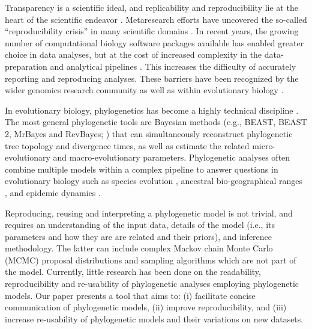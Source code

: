 \documentclass[10pt,letterpaper,table]{article}
\begin{document}
Transparency is a scientific ideal, and replicability and
reproducibility lie at the heart of the scientific endeavor
\cite{nas19,munafo17}. 
Metaresearch efforts have uncovered the so-called ``reproducibility
crisis'' \cite{baker16} in many scientific domains \cite{baker16}. 
In recent years, the growing number of computational biology software packages available has enabled greater choice in data analyses, 
but at the cost of increased complexity in the data-preparation and analytical pipelines \cite{eren2021community}. 
This increases the difficulty of accurately reporting and reproducing analyses. 
These barriers have been recognized by the wider genomics research community \cite{eren2021community} as well as within evolutionary biology \cite{oakley2014osiris}. 

In evolutionary biology, phylogenetics has become a highly technical discipline \cite{oakley2014osiris}. 
The most general phylogenetic tools are Bayesian methods (e.g., BEAST, BEAST 2, MrBayes and
RevBayes; \cite{beast,beast2,revbayes,mrbayes}) 
that can simultaneously reconstruct phylogenetic tree topology and divergence times, as well as estimate the related micro-evolutionary and macro-evolutionary parameters. 
Phylogenetic analyses often combine multiple models within a complex pipeline to answer questions in evolutionary biology such as species evolution \cite{gavryushkina17,ogilvie21,zhang21}, ancestral bio-geographical ranges \cite{lemey10,landis18}, and 
epidemic dynamics \cite{faria21,douglas21}. 

Reproducing, reusing and interpreting a phylogenetic model is not trivial, and requires an understanding of the input data, details of the model (i.e., its parameters and how they are are related and their priors), and inference methodology. 
The latter can include complex Markov chain Monte Carlo (MCMC) proposal distributions and sampling algorithms which are not part of the model.
Currently, little research has been done on the readability, reproducibility and re-usability of phylogenetic analyses employing phylogenetic models. 
Our paper presents a tool that aims to: (i) facilitate concise communication of phylogenetic models, (ii) improve reproducibility, and (iii) increase re-usability of phylogenetic models and their variations on new datasets. 
 
\end{document}
